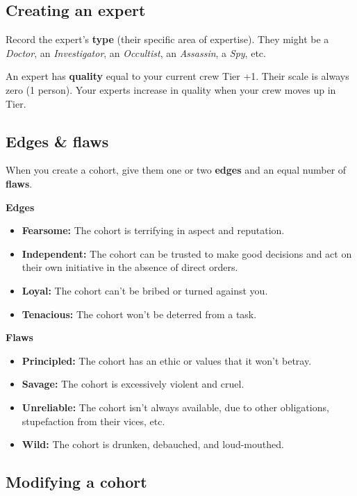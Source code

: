\documentclass[11pt,oneside]{book}
\begin{document}
\subsection{Creating an expert}

Record the expert’s \textbf{type} (their specific area of expertise). They might be a \emph{Doctor}, an \emph{Investigator}, an \emph{Occultist}, an \emph{Assassin}, a \emph{Spy}, etc.

An expert has \textbf{quality} equal to your current crew Tier +1. Their scale is always zero (1 person). Your experts increase in quality when your crew moves up in Tier.

\subsection{Edges \& flaws}

When you create a cohort, give them one or two \textbf{edges} and an equal number of \textbf{flaws}.

\textbf{Edges}

\begin{itemize}
	\item \textbf{Fearsome: }The cohort is terrifying in aspect and reputation.
	\item \textbf{Independent:} The cohort can be trusted to make good decisions and act on their own initiative in the absence of direct orders.
	\item \textbf{Loyal:} The cohort can’t be bribed or turned against you.
	\item \textbf{Tenacious:} The cohort won’t be deterred from a task.
\end{itemize}

\textbf{Flaws}

\begin{itemize}
	\item \textbf{Principled:} The cohort has an ethic or values that it won’t betray.
	\item \textbf{Savage:} The cohort is excessively violent and cruel.
	\item \textbf{Unreliable:} The cohort isn’t always available, due to other obligations, stupefaction from their vices, etc.
	\item \textbf{Wild:} The cohort is drunken, debauched, and loud-mouthed.
\end{itemize}

\subsection{Modifying a cohort}
\end{document}
